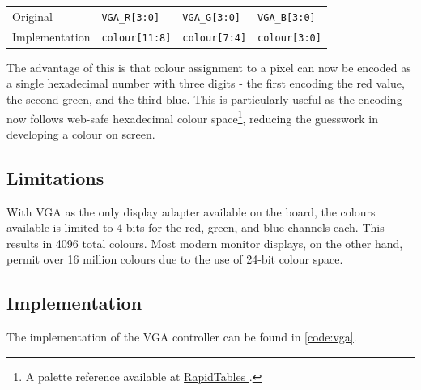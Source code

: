\begin{tabular}{l|lll}
    Original & \lstinline|VGA_R[3:0]| & \lstinline|VGA_G[3:0]| & \lstinline|VGA_B[3:0]| \\
    Implementation & \lstinline|colour[11:8]| & \lstinline|colour[7:4]| & \lstinline|colour[3:0]| 
\end{tabular}

The advantage of this is that colour assignment to a pixel can now be encoded as a single hexadecimal number 
with three digits - the first encoding the red value, the second green, and the third blue. 
This is particularly useful as the encoding now follows web-safe hexadecimal colour space\footnote{
    A palette reference available at \href{https://www.rapidtables.com/web/color/Web_Safe.html}{RapidTables \faExternalLink}.
}, reducing the guesswork in developing a colour on screen.

\subsection{Limitations}
With VGA as the only display adapter available on the board, the colours available is limited 
to 4-bits for the red, green, and blue channels each. This results in 4096 total colours. 
Most modern monitor displays, on the other hand, permit over 16 million colours due to the 
use of 24-bit colour space. 

\subsection{Implementation}
The implementation of the VGA controller can be found in \cref{code:vga}.